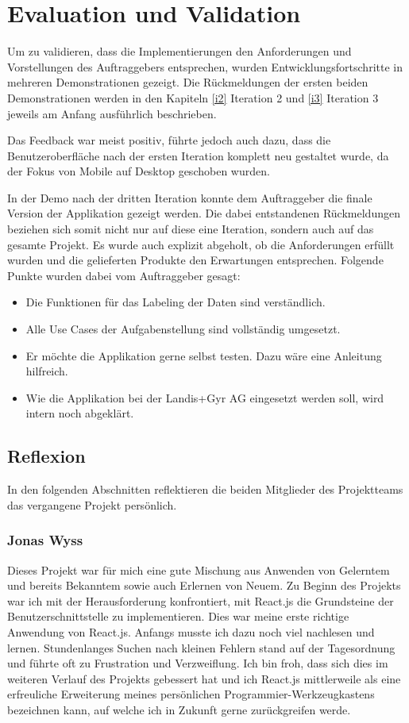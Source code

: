 \chapter{Evaluation und Validation}
Um zu validieren, dass die Implementierungen den Anforderungen und Vorstellungen des Auftraggebers entsprechen,
wurden Entwicklungsfortschritte in mehreren Demonstrationen gezeigt.
Die Rückmeldungen der ersten beiden Demonstrationen werden
in den Kapiteln \ref{i2} Iteration 2 und \ref{i3} Iteration 3 jeweils am Anfang ausführlich beschrieben.

Das Feedback war meist positiv, führte jedoch auch dazu, dass die Benutzeroberfläche nach der ersten Iteration
komplett neu gestaltet wurde, da der Fokus von Mobile auf Desktop geschoben wurden.


In der Demo nach der dritten Iteration konnte dem Auftraggeber die finale Version der Applikation gezeigt werden.
Die dabei entstandenen Rückmeldungen beziehen sich somit nicht nur auf diese eine Iteration, sondern auch auf das gesamte Projekt.
Es wurde auch explizit abgeholt, ob die Anforderungen erfüllt wurden und die gelieferten Produkte den Erwartungen entsprechen.
Folgende Punkte wurden dabei vom Auftraggeber gesagt:
\begin{itemize}
    \item Die Funktionen für das Labeling der Daten sind verständlich.
    \item Alle Use Cases der Aufgabenstellung sind vollständig umgesetzt.
    \item Er möchte die Applikation gerne selbst testen. Dazu wäre eine Anleitung hilfreich.
    \item Wie die Applikation bei der Landis+Gyr AG eingesetzt werden soll, wird intern noch abgeklärt.
\end{itemize}


\section{Reflexion}
In den folgenden Abschnitten reflektieren die beiden Mitglieder des Projektteams das vergangene Projekt persönlich.
\subsection{Jonas Wyss}
Dieses Projekt war für mich eine gute Mischung aus Anwenden von Gelerntem und bereits Bekanntem
sowie auch Erlernen von Neuem.
Zu Beginn des Projekts war ich mit der Herausforderung konfrontiert, mit React.js die Grundsteine der
Benutzerschnittstelle zu implementieren. Dies war meine erste richtige Anwendung von React.js.
Anfangs musste ich dazu noch viel nachlesen und lernen.
Stundenlanges Suchen nach kleinen Fehlern stand auf der Tagesordnung und führte oft zu Frustration und Verzweiflung.
Ich bin froh, dass sich dies im weiteren Verlauf des Projekts gebessert hat und ich React.js mittlerweile als
eine erfreuliche Erweiterung meines persönlichen Programmier-Werkzeugkastens bezeichnen kann,
auf welche ich in Zukunft gerne zurückgreifen werde.

